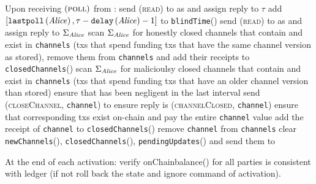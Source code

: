 \begin{functionality}{\fpaynet}
\begin{algorithmic}[1]
    \State Upon receiving $\left(\textsc{poll}\right)$ from \alice:
    \Indent
      \State send (\textsc{read}) to \clock{} as \alice and assign reply to
      $\tau$
        \State add $\left[\mathtt{lastpoll}\left(\mathit{Alice}\right), \tau -
        \texttt{delay}\left(\mathit{Alice}\right) - 1\right]$ to
        \texttt{blindTime}(\alice)
      \EndIf
      \State send (\textsc{read}) to \ledger{} as \alice{} and assign reply to
      $\Sigma_{\mathit{Alice}}$
      \State scan $\Sigma_{\mathit{Alice}}$ for honestly closed channels that contain
      \alice{} and exist in \texttt{channels} (txs that spend funding txs that
      have the same channel version as stored), remove them from
      \texttt{channels} and add their receipts to
      \texttt{closedChannels}(\alice)
      \State scan $\Sigma_{\mathit{Alice}}$ for malicioulsy closed channels that contain
      \alice{} and exist in \texttt{channels} (txs that spend funding txs that
      have an older channel version than stored)
       
          \State ensure that \alice has been negligent in the last interval
        \EndIf
        \State send (\textsc{closeChannel}, \texttt{channel}) to \simulator
        \State ensure reply is (\textsc{channelClosed}, \texttt{channel})
        \State ensure that corresponding txs exist on-chain and pay \alice the
        entire \texttt{channel} value
        \State add the receipt of \texttt{channel} to
        \texttt{closedChannels}(\alice)
        \State remove \texttt{channel} from \texttt{channels}
      \EndFor
      \State clear \texttt{newChannels}(\alice),
      \texttt{closedChannels}(\alice), \texttt{pendingUpdates}(\alice) and send
      them to \alice
    \EndIndent
    \State

    \State At the end of each activation: 
    \Indent
    \State verify  onChainbalance() for all parties is consistent with ledger (if not roll back the state and ignore command of activation).
    \EndIndent
  \end{algorithmic}
\end{functionality}
